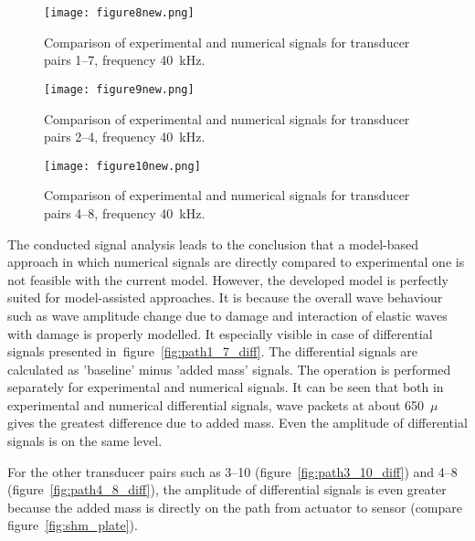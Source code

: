 \documentclass[12pt]{iopart}
\begin{document}
\begin{figure} [h!]
	\centering
	\texttt{[image: figure8new.png]}	
	\caption{Comparison of experimental and numerical signals for transducer pairs 1--7, frequency 40~kHz.}
	\label{fig:path1_7}
\end{figure}
\begin{figure} [h!]
	\centering
	\texttt{[image: figure9new.png]}	
	\caption{Comparison of experimental and numerical signals for transducer pairs 2--4, frequency 40~kHz.}
	\label{fig:path2_4}
\end{figure}
\begin{figure} [h!]
	\centering
	\texttt{[image: figure10new.png]}	
	\caption{Comparison of experimental and numerical signals for transducer pairs 4--8, frequency 40~kHz.}
	\label{fig:path4_8}
\end{figure}
\clearpage
The conducted signal analysis leads to the conclusion that a model-based approach in which numerical signals are directly compared to experimental one is not feasible with the current model. However, the developed model is perfectly suited for model-assisted approaches. It is because the overall wave behaviour such as wave amplitude change due to damage and interaction of elastic waves with damage is properly modelled. It especially visible in case of differential signals presented in~figure~\ref{fig:path1_7_diff}. The differential signals are calculated as 'baseline' minus 'added mass' signals. The operation is performed separately for experimental and numerical signals. It can be seen that both in experimental and numerical differential signals, wave packets at about 650~\(\mu\) gives the greatest difference due to added mass. Even the amplitude of differential signals is on the same level.

For the other transducer pairs such as 3--10 (figure~\ref{fig:path3_10_diff}) and 4--8 (figure~\ref{fig:path4_8_diff}), the amplitude of differential signals is even greater because the added mass is directly on the path from actuator to sensor (compare figure~\ref{fig:shm_plate}).
\end{document}

